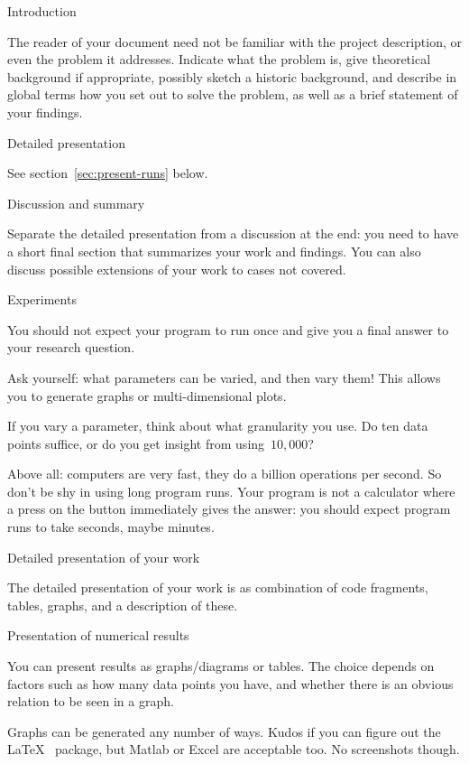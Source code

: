  {Introduction}

The reader of your document need not be familiar with the project
description, or even the problem it addresses.  Indicate what the
problem is, give theoretical background if appropriate, possibly
sketch a historic background, and describe in global terms how you set
out to solve the problem,
as well as a brief statement of your findings.

 {Detailed presentation}

See section~\ref{sec:present-runs} below.

 {Discussion and summary}

Separate the detailed presentation from a discussion at the end:
you need to have a short final section that summarizes your work and findings.
You can also discuss possible extensions of your work to cases not covered.

 {Experiments}

You should not expect your program to run once and give you a final
answer to your research question.

Ask yourself: what parameters can be varied, and then vary them!
This allows you to generate graphs or multi-dimensional plots.

If you vary a parameter, think about what granularity you use.
Do ten data points suffice, or do you get insight from using~$10,000$?

Above all: computers are very fast, they do a billion operations per second.
So don't be shy in using long program runs.
Your program is not a calculator where a press on the button
immediately gives the answer: you should expect program runs
to take seconds, maybe minutes.

 {Detailed presentation of your work}
\label{sec:present-runs}

The detailed presentation of your work is as combination of
code fragments, tables, graphs, and a description of these.

 {Presentation of numerical results}

You can present results as graphs/diagrams or tables. The choice
depends on factors such as how many data points you have,
and whether there is an obvious relation to be seen in a graph.

Graphs can be generated any number of ways.
Kudos if you can figure out the \LaTeX\  package,
but Matlab or Excel are acceptable too.
No screenshots though.

